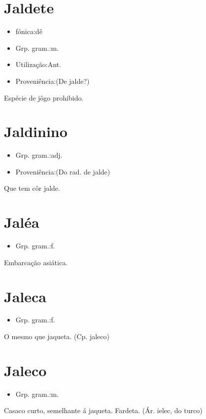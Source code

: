 \documentclass{article}
\begin{document}
\section{Jaldete}
\begin{itemize}
\item {fónica:dê}
\end{itemize}
\begin{itemize}
\item {Grp. gram.:m.}
\end{itemize}
\begin{itemize}
\item {Utilização:Ant.}
\end{itemize}
\begin{itemize}
\item {Proveniência:(De \textunderscore jalde\textunderscore ?)}
\end{itemize}
Espécie de jôgo prohibido.
\section{Jaldinino}
\begin{itemize}
\item {Grp. gram.:adj.}
\end{itemize}
\begin{itemize}
\item {Proveniência:(Do rad. de \textunderscore jalde\textunderscore )}
\end{itemize}
Que tem côr jalde.
\section{Jaléa}
\begin{itemize}
\item {Grp. gram.:f.}
\end{itemize}
Embarcação asiática.
\section{Jaleca}
\begin{itemize}
\item {Grp. gram.:f.}
\end{itemize}
O mesmo que \textunderscore jaqueta\textunderscore .
(Cp. \textunderscore jaleco\textunderscore )
\section{Jaleco}
\begin{itemize}
\item {Grp. gram.:m.}
\end{itemize}
Casaco curto, semelhante á jaqueta.
Fardeta.
(Ár. \textunderscore ielec\textunderscore , do turco)
\end{document}

